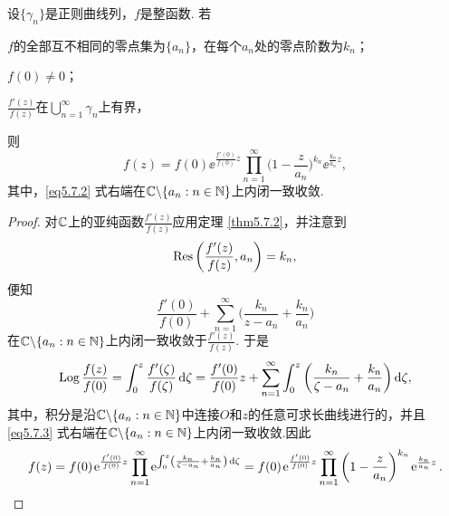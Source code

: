 \begin{theorem}\label{thm5.7.3}
  设$\{\gamma_n\}$是正则曲线列，$f$是整函数. 若
  \begin{eenum}
    \item $f$的全部互不相同的零点集为$\{a_n\}$，在每个$a_n$处的零点阶数为$k_n$；
    \item $f(0)\ne0$；
    \item $\frac{f'(z)}{f(z)}$在$\bigcup_{n=1}^\infty\gamma_n$上有界，
  \end{eenum}
  则
  \begin{equation}\label{eq5.7.2}
    f(z) = f(0) \ee^{\frac{f'(0)}{f(0)}z}\prod_{n=1}^\infty\bigg(1-\frac z{a_n}\bigg)
    ^{k_n}\ee^{\frac{k_n}{a_n}z},
  \end{equation}
  其中，\eqref{eq5.7.2} 式右端在$\mathbb C\backslash\{a_n:n\in\mathbb N\}$上内闭一致收敛.
\end{theorem}
\begin{proof}
  对$\mathbb C$上的亚纯函数$\frac{f'(z)}{f(z)}$应用定理 \ref{thm5.7.2}，并注意到
  \[
    \operatorname*{Res}\bigg(\frac{f'(z)}{f(z)},a_n\bigg) = k_n,
  \]
  便知
  \[
    \frac{f'(0)}{f(0)} + \sum_{n=1}^\infty\bigg(\frac{k_n}{z-a_n} + \frac{k_n}{a_n}\bigg)
  \]
  在$\mathbb C\backslash\{a_n:n\in\mathbb N\}$上内闭一致收敛于$\frac{f'(z)}{f(z)}$. 于是
  \begin{equation}\label{eq5.7.3}
    \operatorname{Log}\frac{f(z)}{f(0)}=\int_0^z\frac{f'(\zeta)}{f(\zeta)}\mathop{}\!\mathrm{d} \zeta = \frac{f'(0)}{f(0)}z+\sum_{n=1}^\infty\int_0^z\bigg(\frac{k_n}{\zeta-a_n}+
    \frac{k_n}{a_n}\bigg)\mathop{}\!\mathrm{d} \zeta,
  \end{equation}
  其中，积分是沿$\mathbb C\backslash\{a_n:n\in\mathbb N\}$中连接$O$和$z$的任意可求长曲线进行的，并且 \eqref{eq5.7.3} 式右端在$\mathbb C\backslash\{a_n:n\in\mathbb N\}$上内闭一致收敛.因此
  \begin{equation*}
    f(z) = f(0)\ee^{\frac{f'(0)}{f(0)}z}\prod_{n=1}^\infty \ee^{\int_0^z\left(\frac{k_n}{\zeta-a_n}+
    \frac{k_n}{a_n}\right) \dif \zeta}
    = f(0)\ee^{\frac{f'(0)}{f(0)}z}\prod_{n=1}^\infty\bigg(1-\frac z{a_n}\bigg)  ^{k_n}\ee^{\frac{k_n}{a_n}z}. \qedhere
  \end{equation*}
\end{proof}

